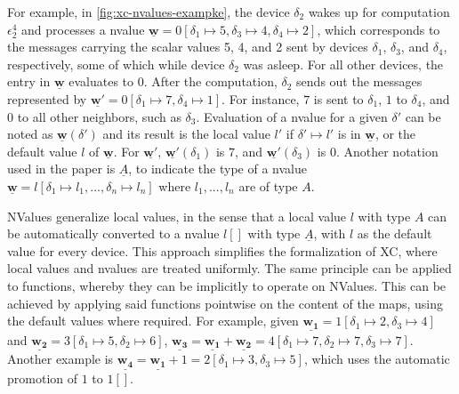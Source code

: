 For example, in \cref{fig:xc-nvalues-exampke}, the device $\delta_2$ wakes up for computation $\epsilon_2^4$ and processes a nvalue $\underline{\mathbf{w}} = 0[\delta_1 \mapsto 5, \delta_3 \mapsto 4, \delta_4 \mapsto 2]$, which corresponds to the messages carrying the scalar values 5, 4, and 2 sent by devices $\delta_1$, $\delta_3$, and $\delta_4$, respectively, some of which while device $\delta_2$ was asleep.
%
For all other devices, the entry in $\underline{\mathbf{w}}$ evaluates to $0$.
%
After the computation, $\delta_2$ sends out the messages represented by $\underline{\mathbf{w'}} = 0[\delta_1 \mapsto 7, \delta_4 \mapsto 1]$.
%
For instance, $7$ is sent to $\delta_1$, $1$ to $\delta_4$, and $0$ to all other neighbors, such as $\delta_3$.
%
Evaluation of a nvalue for a given $\delta'$ can be noted as $\underline{\mathbf{w}}(\delta')$ and its result is the local value $l'$ if $\delta' \mapsto l'$ is in $\underline{\mathbf{w}}$, or the default value $l$ of $\underline{\mathbf{w}}$.
%
For $\underline{\mathbf{w'}}$, $\underline{\mathbf{w'}}(\delta_1)$ is $7$, and $\underline{\mathbf{w'}}(\delta_3)$ is 0.
%
Another notation used in the paper is $\underline{A}$, to indicate the type of a nvalue $\underline{\mathbf{w}} = l[\delta_1 \mapsto l_1, ..., \delta_n \mapsto l_n]$ where $l_1, ..., l_n$ are of type $A$\cite{xc}.

NValues generalize local values, in the sense that a local value $l$ with type $A$ can be automatically converted to a nvalue $l[]$ with type $\underline{A}$, with $l$ as the default value for every device\cite{xc}.
%
This approach simplifies the formalization of \ac{XC}, where local values and nvalues are treated uniformly\cite{xc}.
%
The same principle can be applied to functions,  whereby they can be implicitly  to operate on NValues.
%
This can be achieved by applying said functions pointwise on the content of the maps, using the default values where required\cite{xc}.
%
For example, given $\underline{\mathbf{w_1}} = 1[\delta_1 \mapsto 2, \delta_3 \mapsto 4]$ and $\underline{\mathbf{w_2}} = 3[\delta_1 \mapsto 5, \delta_2 \mapsto 6]$, $\underline{\mathbf{w_3}} = \underline{\mathbf{w_1}} + \underline{\mathbf{w_2}} = 4[\delta_1 \mapsto 7, \delta_2 \mapsto 7, \delta_3 \mapsto 7]$.
%
Another example is $\underline{\mathbf{w_4}} = \underline{\mathbf{w_1}} + 1 = 2[\delta_1 \mapsto 3, \delta_3 \mapsto 5]$, which uses the automatic promotion of $1$ to $1[]$.

